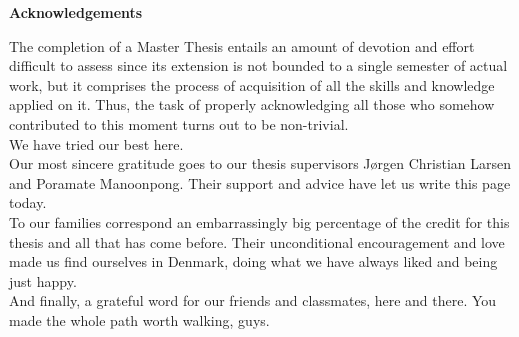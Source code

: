 \newenvironment{acknowledgements}%
    {\null\vfill\begin{center}%
    \bfseries Acknowledgements\end{center}}%
    {\vfill\null}
        \begin{acknowledgements}
        The completion of a Master Thesis entails an amount of devotion and effort difficult to assess since its extension is not bounded to a single semester of actual work, but it comprises the process of acquisition of all the skills and knowledge applied on it.
        Thus, the task of properly acknowledging all those who somehow contributed to this moment turns out to be non-trivial.\\ 
        We have tried our best here.\\
        Our most sincere gratitude goes to our thesis supervisors Jørgen Christian Larsen and Poramate Manoonpong. 
        Their support and advice have let us write this page today.\\
        To our families correspond an embarrassingly big percentage of the credit for this thesis and all that has come before. Their unconditional encouragement and love made us find ourselves in Denmark, doing what we have always liked and being just happy.\\
        And finally, a grateful word for our friends and classmates, here and there.
        You made the whole path worth walking, guys.
        \end{acknowledgements}